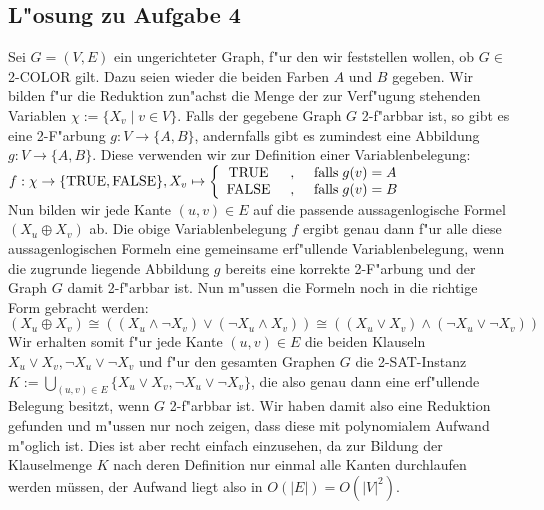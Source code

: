 \documentclass[10pt,oneside,onecolumn,a4paper,german,titlepage]{article}
\begin{document}
\subsection*{L"osung zu Aufgabe 4}
Sei $G = (V,E)$ ein ungerichteter Graph, f"ur den wir feststellen wollen, ob $G \in$
2-COLOR gilt. Dazu seien wieder die beiden Farben $A$ und $B$ gegeben. Wir bilden
f"ur die Reduktion zun"achst die Menge der zur Verf"ugung stehenden Variablen
$\chi := \{X_v \; | \; v \in V\}$. Falls der gegebene Graph $G$ 2-f"arbbar ist, so
gibt es eine 2-F"arbung $g: V \to \{A,B\}$, andernfalls gibt es zumindest eine
Abbildung $g: V \to \{A,B\}$. Diese verwenden wir zur Definition einer
Variablenbelegung:\\[4pt]
$f: \chi \to \{\mbox{TRUE},\mbox{FALSE}\}, X_v \mapsto
\left\{\begin{array}{c@{\hspace{0.5cm},\hspace{0.5cm}}l}
\mbox{TRUE} & \mbox{falls} \; g(v) = A\\
\mbox{FALSE} & \mbox{falls} \; g(v) = B
\end{array}\right.$\\[4pt]
Nun bilden wir jede Kante $(u,v) \in E$ auf die passende aussagenlogische Formel
$(X_u \oplus X_v)$ ab. Die obige Variablenbelegung $f$ ergibt genau dann f"ur alle
diese aussagenlogischen Formeln eine gemeinsame erf"ullende Variablenbelegung, wenn
die zugrunde liegende Abbildung $g$ bereits eine korrekte 2-F"arbung und der Graph
$G$ damit 2-f"arbbar ist. Nun m"ussen die Formeln noch in die richtige Form gebracht
werden:\\[4pt]
$(X_u \oplus X_v) \cong ((X_u \wedge \neg X_v) \vee (\neg X_u \wedge X_v)) \cong
((X_u \vee X_v) \wedge (\neg X_u \vee \neg X_v))$\\[4pt]
Wir erhalten somit f"ur jede Kante $(u,v) \in E$ die beiden Klauseln $X_u \vee X_v,
\neg X_u \vee \neg X_v$ und f"ur den gesamten Graphen $G$ die 2-SAT-Instanz
$K := \bigcup\limits_{(u,v) \in E} \{X_u \vee X_v,\neg X_u \vee \neg X_v\}$, die
also genau dann eine erf"ullende Belegung besitzt, wenn $G$ 2-f"arbbar ist. Wir haben
damit also eine Reduktion gefunden und m"ussen nur noch zeigen, dass diese mit
polynomialem Aufwand m"oglich ist. Dies ist aber recht einfach einzusehen, da zur
Bildung der Klauselmenge $K$ nach deren Definition nur einmal alle Kanten durchlaufen
werden müssen, der Aufwand liegt also in $O(|E|) = O(|V|^2)$.
\end{document}
